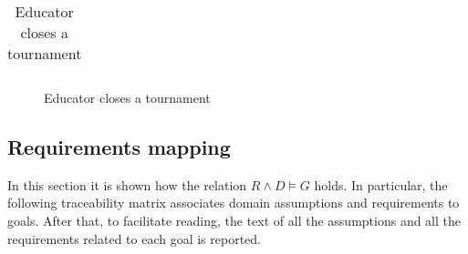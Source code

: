 \begin{enumerate}[label=\textbf{UC\arabic*}:,ref=UC\arabic*,leftmargin=1.3cm]
{\begin{table}[H]
\begin{tabular}{|l|p{11.9cm}|}
                  \end{tabular}
                  \caption{Educator closes a tournament   }
                  \label{table:Educator closes a tournament   }
            \end{table}
            \begin{figure}[H]
                  \centering
                  \caption{Educator closes a tournament   }
                  \label{fig:Educator closes a tournament   }
            \end{figure}
      }
\end{enumerate}
\subsection{Requirements mapping}
In this section it is shown how the relation $R\land D \models G$ holds.
In particular, the following traceability matrix associates domain assumptions and requirements to goals.
After that, to facilitate reading, the text of all the assumptions and all the requirements related to each goal is reported.

